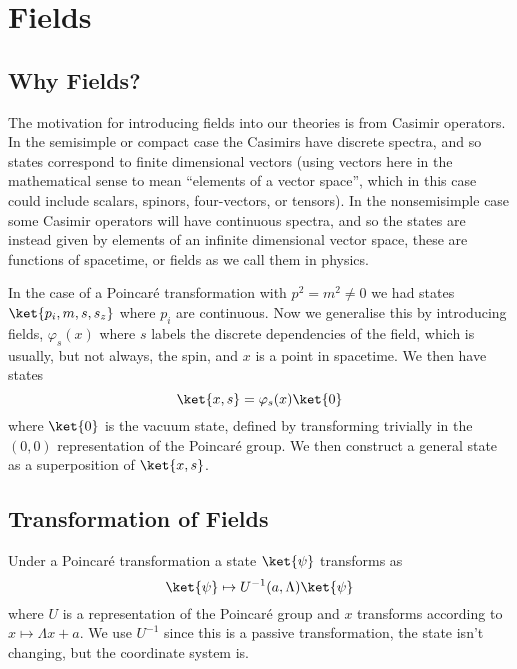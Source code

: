 \documentclass[fleqn]{NotesClass}
\begin{document}
    \chapter{Fields}
    \section{Why Fields?}
    The motivation for introducing fields into our theories is from Casimir operators.
    In the semisimple or compact case the Casimirs have discrete spectra, and so states correspond to finite dimensional vectors (using vectors here in the mathematical sense to mean \enquote{elements of a vector space}, which in this case could include scalars, spinors, four-vectors, or tensors).
    In the nonsemisimple case some Casimir operators will have continuous spectra, and so the states are instead given by elements of an infinite dimensional vector space, these are functions of spacetime, or fields as we call them in physics.
    
    In the case of a Poincar\'e transformation with \(p^2 = m^2 \ne 0\) we had states \(\ket{p_i, m, s, s_z}\) where \(p_i\) are continuous.
    Now we generalise this by introducing fields, \(\varphi_s(x)\) where \(s\) labels the discrete dependencies of the field, which is usually, but not always, the spin, and \(x\) is a point in spacetime.
    We then have states
    \begin{equation}
        \ket{x, s} = \varphi_s(x) \ket{0}
    \end{equation}
    where \(\ket{0}\) is the vacuum state, defined by transforming trivially in the \((0, 0)\) representation of the Poincar\'e group.
    We then construct a general state as a superposition of \(\ket{x, s}\).
    
    \section{Transformation of Fields}
    Under a Poincar\'e transformation a state \(\ket{\psi}\) transforms as
    \begin{equation}
        \ket{\psi} \mapsto U^{-1}(a, \Lambda) \ket{\psi}
    \end{equation}
    where \(U\) is a representation of the Poincar\'e group and \(x\) transforms according to \(x \mapsto \Lambda x + a\).
    We use \(U^{-1}\) since this is a passive transformation, the state isn't changing, but the coordinate system is.
    
\end{document}
